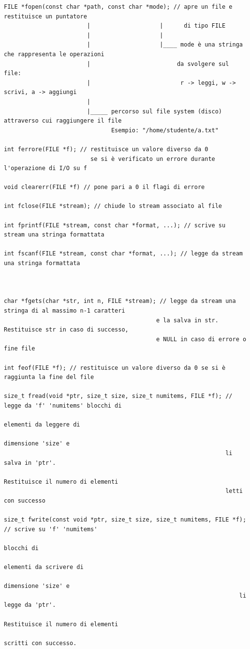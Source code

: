 \begin{verbatim}
FILE *fopen(const char *path, const char *mode); // apre un file e restituisce un puntatore 
                        |                    |      di tipo FILE
                        |                    |
                        |                    |____ mode è una stringa che rappresenta le operazioni 
                        |                         da svolgere sul file: 
                        |                          r -> leggi, w -> scrivi, a -> aggiungi
                        |
                        |_____ percorso sul file system (disco) attraverso cui raggiungere il file
                               Esempio: "/home/studente/a.txt"       

int ferrore(FILE *f); // restituisce un valore diverso da 0 
                         se si è verificato un errore durante l'operazione di I/O su f
                        
void clearerr(FILE *f) // pone pari a 0 il flagi di errore

int fclose(FILE *stream); // chiude lo stream associato al file

int fprintf(FILE *stream, const char *format, ...); // scrive su stream una stringa formattata

int fscanf(FILE *stream, const char *format, ...); // legge da stream una stringa formattata



char *fgets(char *str, int n, FILE *stream); // legge da stream una stringa di al massimo n-1 caratteri 
                                            e la salva in str.  Restituisce str in caso di successo,
                                            e NULL in caso di errore o fine file

int feof(FILE *f); // restituisce un valore diverso da 0 se si è raggiunta la fine del file 

size_t fread(void *ptr, size_t size, size_t numitems, FILE *f); // legge da 'f' 'numitems' blocchi di 
                                                                elementi da leggere di
                                                                dimensione 'size' e 
                                                                li salva in 'ptr'. 
                                                                Restituisce il numero di elementi 
                                                                letti con successo

size_t fwrite(const void *ptr, size_t size, size_t numitems, FILE *f); // scrive su 'f' 'numitems' 
                                                                    blocchi di 
                                                                    elementi da scrivere di
                                                                    dimensione 'size' e 
                                                                    li legge da 'ptr'. 
                                                                    Restituisce il numero di elementi 
                                                                    scritti con successo.


\end{verbatim}
